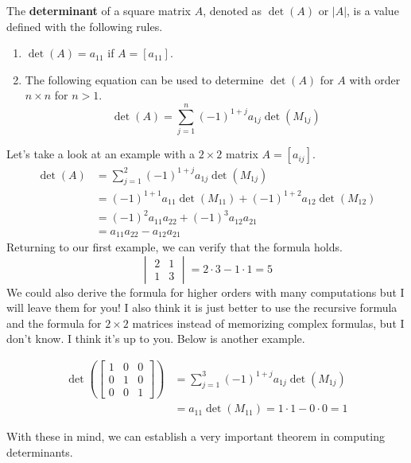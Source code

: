 \documentclass[../../main.tex]{subfiles}
\begin{document}
\begin{definition}{}{}
The \textbf{determinant} of a square matrix $A$, denoted as $\det(A)$
or $|A|$, is a value defined with the following rules.
\begin{enumerate}[noitemsep]
\item $\det(A) = a_{11}$ if $A = [a_{11}]$.
\item The following equation can be used to determine $\det(A)$ for
$A$ with order $n \times n$ for $n > 1$.
\vspace{-0.5\baselineskip}
\[
\det(A)
= \sum_{j=1}^n (-1)^{1 + j} a_{1j} \det(M_{1j})
\]
\end{enumerate}
\end{definition}

Let's take a look at an example with a $2 \times 2$ matrix
$A = [a_{ij}]$.
\begin{align*}
    \det(A)
    &= \sum_{j=1}^2 (-1)^{1 + j} a_{1j} \det(M_{1j}) \\
    &= (-1)^{1 + 1} a_{11} \det(M_{11}) +
        (-1)^{1 + 2} a_{12} \det(M_{12}) \\
    &= (-1)^{2} a_{11} a_{22} + (-1)^{3} a_{12} a_{21} \\
    &= a_{11} a_{22} - a_{12} a_{21}
\end{align*}
Returning to our first example, we can verify that the formula holds.
\[
\begin{vmatrix}
    2 & 1 \\
    1 & 3
\end{vmatrix}
= 2 \cdot 3 - 1 \cdot 1
= 5
\]
We could also derive the formula for higher orders with many
computations but I will leave them for you! I also think it is
just better to use the recursive formula and the formula for
$2 \times 2$ matrices instead of memorizing complex formulas,
but I don't know. I think it's up to you. Below is another
example.

\begin{align*}
    \det\left(
        \begin{bmatrix}
            1 & 0 & 0 \\
            0 & 1 & 0 \\
            0 & 0 & 1
        \end{bmatrix}
    \right)
    &= \sum_{j=1}^3 (-1)^{1 + j} a_{1j} \det(M_{1j}) \\
    &= a_{11} \det(M_{11})
    = 1 \cdot 1 - 0 \cdot 0 = 1
\end{align*}

With these in mind, we can establish a very important theorem in
computing determinants.
\end{document}
